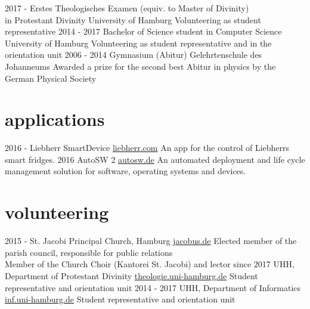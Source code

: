 \documentclass[]{friggeri-cv}
\begin{document}
\begin{entrylist}
  \entry
    {2017 - }
    {Erstes Theologisches Examen (equiv. to Master of Divinity) \\ {\normalfont in Protestant Divinity}}
    {University of Hamburg}
    {Volunteering as student representative}
  \entry
    {2014 - 2017}
    {Bachelor of Science student {\normalfont in Computer Science}}
    {University of Hamburg}
    {Volunteering as student representative and in the orientation unit}
  \entry
    {2006 - 2014}
    {Gymnasium (Abitur)}
    {Gelehrtenschule des Johanneums}
    {Awarded a prize for the second best Abitur in physics by the German Physical Society}
\end{entrylist}

\section{applications}

\begin{entrylist}
  \entry
    {2016 - }
    {Liebherr SmartDevice}
    {\href{https://home.liebherr.com/de/deu/myliebherr_home/smartdevice-special/special-smartdevice.html}{liebherr.com}}
    {An app for the control of Liebherrs smart fridges.}
 \entry
    {2016}
    {AutoSW 2}
    {\href{https://www.autosw.de/Demo/Benefit}{autosw.de}}
    {An automated deployment and life cycle management solution for software, operating systems and devices.}
\end{entrylist}

\section{volunteering}

  \begin{entrylist}
    \entry
      {2015 - }
      {St. Jacobi Principal Church, Hamburg}
      {\href{http://www.jacobus.de}{jacobus.de}}
      {Elected member of the parish council, responsible for public relations \\
      Member of the Church Choir (Kantorei St. Jacobi) and lector}
      \entry
      {since 2017}
      {UHH, Department of Protestant Divinity}
      {\href{https://www.theologie.uni-hamburg.de/}{theologie.uni-hamburg.de}}
      {Student representative and orientation unit}
    \entry
      {2014 - 2017}
      {UHH, Department of Informatics}
      {\href{https://www.inf.uni-hamburg.de/en.html}{inf.uni-hamburg.de}}
      {Student representative and orientation unit}
  \end{entrylist}
\end{document}
